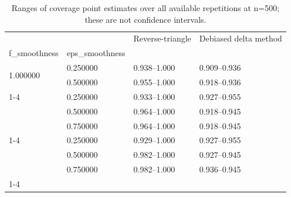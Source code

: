 \begin{table}
\caption{Ranges of coverage point estimates over all available repetitions at n=500; these are not confidence intervals.}
\label{tab:experiment_details_additional_coverage_summary_N500}
\begin{tabular}{llll}
\toprule
 &  & Reverse-triangle & Debiased delta method \\
f_smoothness & eps_smoothness &  &  \\
\midrule
\multirow[t]{2}{*}{1.000000} & 0.250000 & 0.938--1.000 & 0.909--0.936 \\
 & 0.500000 & 0.955--1.000 & 0.918--0.936 \\
\cline{1-4}
\multirow[t]{3}{*}{1.500000} & 0.250000 & 0.933--1.000 & 0.927--0.955 \\
 & 0.500000 & 0.964--1.000 & 0.918--0.945 \\
 & 0.750000 & 0.964--1.000 & 0.918--0.945 \\
\cline{1-4}
\multirow[t]{3}{*}{2.000000} & 0.250000 & 0.929--1.000 & 0.927--0.955 \\
 & 0.500000 & 0.982--1.000 & 0.927--0.945 \\
 & 0.750000 & 0.982--1.000 & 0.936--0.945 \\
\cline{1-4}
\bottomrule
\end{tabular}
\end{table}
